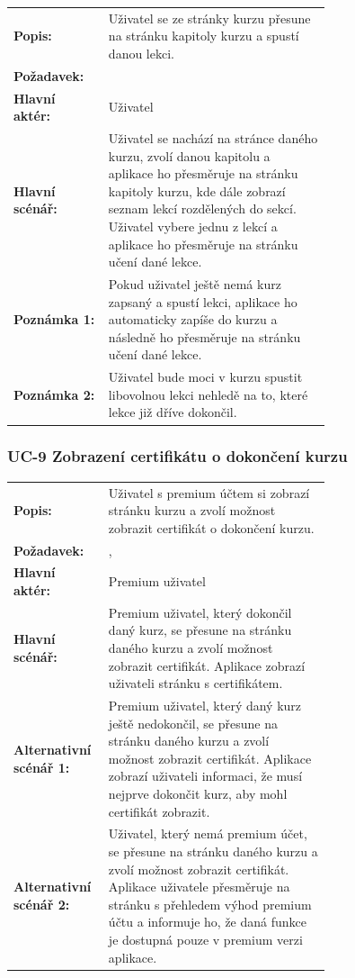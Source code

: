 \begin{tabular}{lp{0.7\linewidth}}
  \textbf{Popis:} & Uživatel se ze stránky kurzu přesune na stránku kapitoly kurzu a spustí danou lekci. \\
  \textbf{Požadavek:} & \nameref{sec:fp-course-chapter-page} \\
  \textbf{Hlavní aktér:} & Uživatel \\
  \textbf{Hlavní scénář:} & Uživatel se nachází na stránce daného kurzu, zvolí danou kapitolu a aplikace ho přesměruje na stránku kapitoly kurzu, kde dále zobrazí seznam lekcí rozdělených do sekcí. Uživatel vybere jednu z lekcí a aplikace ho přesměruje na stránku učení dané lekce. \\
  \textbf{Poznámka 1:} & Pokud uživatel ještě nemá kurz zapsaný a spustí lekci, aplikace ho automaticky zapíše do kurzu a následně ho přesměruje na stránku učení dané lekce. \\
  \textbf{Poznámka 2:} & Uživatel bude moci v kurzu spustit libovolnou lekci nehledě na to, které lekce již dříve dokončil.
\end{tabular}

\subsubsection{UC-9 Zobrazení certifikátu o dokončení kurzu}

\begin{tabular}{lp{0.7\linewidth}}
  \textbf{Popis:} & Uživatel s premium účtem si zobrazí stránku kurzu a zvolí možnost zobrazit certifikát o dokončení kurzu. \\
  \textbf{Požadavek:} & \nameref{sec:fp-course-certificate}, \nameref{sec:fp-subscription-system} \\
  \textbf{Hlavní aktér:} & Premium uživatel \\
  \textbf{Hlavní scénář:} & Premium uživatel, který dokončil daný kurz, se přesune na stránku daného kurzu a zvolí možnost zobrazit certifikát. Aplikace zobrazí uživateli stránku s certifikátem. \\
  \textbf{Alternativní scénář 1:} & Premium uživatel, který daný kurz ještě nedokončil, se přesune na stránku daného kurzu a zvolí možnost zobrazit certifikát. Aplikace zobrazí uživateli informaci, že musí nejprve dokončit kurz, aby mohl certifikát zobrazit. \\
  \textbf{Alternativní scénář 2:} & Uživatel, který nemá premium účet, se přesune na stránku daného kurzu a zvolí možnost zobrazit certifikát. Aplikace uživatele přesměruje na stránku s přehledem výhod premium účtu a informuje ho, že daná funkce je dostupná pouze v premium verzi aplikace. \\
\end{tabular}

